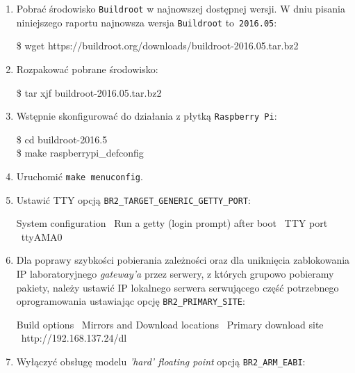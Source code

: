 \documentclass{article}
\newcommand{\buildrootver}{2016.05}
\newenvironment{ttblock}{\ttfamily}{\par}
\begin{document}
\begin{enumerate}
\item Pobrać środowisko \texttt{Buildroot} w najnowszej dostępnej wersji. W dniu pisania niniejszego raportu najnowsza wersja \texttt{Buildroot} to~\texttt{\buildrootver}:

\begin{ttblock}
\$ wget https://buildroot.org/downloads/buildroot-\buildrootver.tar.bz2
\end{ttblock}

\item Rozpakować pobrane środowisko:

\begin{ttblock}
\$ tar xjf buildroot-\buildrootver.tar.bz2
\end{ttblock}

\item Wstępnie skonfigurować do działania z płytką \texttt{Raspberry~Pi}:

\begin{ttblock}
\$ cd buildroot-2016.5\\
\$ make raspberrypi\_defconfig
\end{ttblock}

\item Uruchomić \texttt{make menuconfig}.

\item Ustawić TTY opcją \texttt{BR2\_TARGET\_GENERIC\_GETTY\_PORT}:

\begin{ttblock}
System configuration \textrightarrow\ Run a getty (login prompt) after boot \textrightarrow\ TTY port \textrightarrow\ ttyAMA0
\end{ttblock}

\item Dla poprawy szybkości pobierania zależności oraz dla uniknięcia zablokowania IP laboratoryjnego \emph{gateway'a} przez serwery, z których grupowo pobieramy pakiety, należy ustawić IP lokalnego serwera serwującego część potrzebnego oprogramowania ustawiając opcję \texttt{BR2\_PRIMARY\_SITE}:

\begin{ttblock}
Build options \textrightarrow\ Mirrors and Download locations \textrightarrow\ Primary download site \textrightarrow\ http://192.168.137.24/dl
\end{ttblock}

\item Wyłączyć obsługę modelu \emph{'hard' floating point} opcją \texttt{BR2\_ARM\_EABI}:


\end{enumerate}
\end{document}
